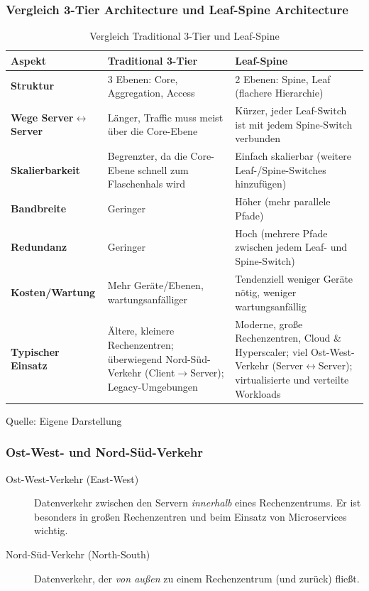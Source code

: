 \subsubsection{Vergleich 3-Tier Architecture und Leaf-Spine Architecture}
\begin{table}[H]
  \caption{Vergleich Traditional 3-Tier und Leaf-Spine}\label{tab:tier-leafspine}
  \begin{tabularx}{\textwidth}{|l|X|X|}  %
    \hline
    \textbf{Aspekt} & \textbf{Traditional 3-Tier} & \textbf{Leaf-Spine} \\
    \hline
    \textbf{Struktur} & 3 Ebenen: Core, Aggregation, Access & 2 Ebenen: Spine, Leaf (flachere Hierarchie) \\
    \hline
    \textbf{Wege Server$\leftrightarrow$Server} & Länger, Traffic muss meist über die Core-Ebene & Kürzer, jeder Leaf-Switch ist mit jedem Spine-Switch verbunden \\
    \hline
    \textbf{Skalierbarkeit} & Begrenzter, da die Core-Ebene schnell zum Flaschenhals wird & Einfach skalierbar (weitere Leaf-/Spine-Switches hinzufügen) \\
    \hline
    \textbf{Bandbreite} & Geringer & Höher (mehr parallele Pfade) \\
    \hline
    \textbf{Redundanz} & Geringer & Hoch (mehrere Pfade zwischen jedem Leaf- und Spine-Switch) \\
    \hline
    \textbf{Kosten/Wartung} & Mehr Geräte/Ebenen, wartungsanfälliger & Tendenziell weniger Geräte nötig, weniger wartungsanfällig \\
    \hline
    \textbf{Typischer Einsatz} & Ältere, kleinere Rechenzentren; überwiegend Nord-Süd-Verkehr (Client$\rightarrow$Server); Legacy-Umgebungen & Moderne, große Rechenzentren, Cloud \& Hyperscaler; viel Ost-West-Verkehr (Server$\leftrightarrow$Server); virtualisierte und verteilte Workloads \\
    \hline
  \end{tabularx}

  \footnotesize Quelle: Eigene Darstellung
\end{table}

\subsubsection{Ost-West- und Nord-Süd-Verkehr}
\begin{description}
  \item[Ost-West-Verkehr (East-West)] Datenverkehr zwischen den Servern
    \emph{innerhalb} eines Rechenzentrums. Er ist besonders in großen
    Rechenzentren und beim Einsatz von Microservices wichtig.
  \item[Nord-Süd-Verkehr (North-South)] Datenverkehr, der \emph{von außen} zu
    einem Rechenzentrum (und zurück) fließt.
\end{description}

